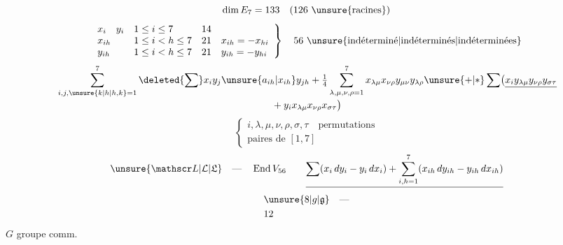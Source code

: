 \[
 \dim E_7=133\quad(126\ \text{\unsure{racines}})
\]
\[
\left.\begin{array}{llll}
 x_i\quad y_{i} &1\le i\le7&14&\\
 x_{ih}&1\le i<h\le7&21&x_{ih}=-x_{hi}\\
 y_{ih}&1\le i<h\le7&21&y_{ih}=-y_{hi}
\end{array}\right\}\quad56\ \text{\unsure{indéterminé|indéterminés|indéterminées}}
\]
\[
\begin{aligned}
 &\sum_{i,j,\unsure{k|h|h,k}=1}^{7}\deleted{\sum}x_i y_j\unsure{a_{ih}|x_{ih}}y_{jh}
 +\tfrac14\sum_{\lambda,\mu,\nu,\rho=1}^{7}x_{\lambda\mu}x_{\nu\rho}y_{\mu\nu}y_{\lambda\rho}
 \unsure{+|\ast}\sum\bigl(\underline{x_i y_{\lambda\mu}y_{\nu\rho}y_{\sigma\tau}}\\[-2pt]
 &\hspace{22em}{}+y_i x_{\lambda\mu}x_{\nu\rho}x_{\sigma\tau}\bigr)
\end{aligned}
\]
\[
 \left\{\begin{gathered}
 i,\lambda,\mu,\nu,\rho,\sigma,\tau\quad\text{permutations}\\
 \text{paires de }[1,7]
 \end{gathered}\right.
\]
\[
\unsure{\mathscr L|\mathcal L|\mathfrak L}\quad\text{---}\quad \operatorname{End} V_{56}
\qquad
\underline{\sum(x_i\,dy_i-y_i\,dx_i)+
 \sum_{i,h=1}^{7}(x_{ih}\,dy_{ih}-y_{ih}\,dx_{ih})}
\]
\[
\begin{aligned}
 &\unsure{8|g|\mathfrak g}\quad\text{---}\\
 &12
\end{aligned}
\]
\(G\) groupe comm.

